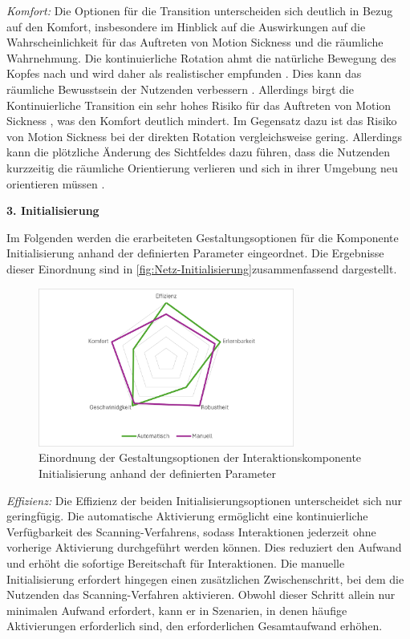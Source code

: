 \textit{Komfort:}
Die Optionen für die Transition unterscheiden sich deutlich in Bezug auf den Komfort, insbesondere im Hinblick auf die Auswirkungen auf die Wahrscheinlichkeit für das Auftreten von Motion Sickness und die räumliche Wahrnehmung.
Die kontinuierliche Rotation ahmt die natürliche Bewegung des Kopfes nach und wird daher als realistischer empfunden \citep{8797722}. Dies kann das räumliche Bewusstsein der Nutzenden verbessern \citep{10.1145/3441852.3471230}. Allerdings birgt die Kontinuierliche Transition ein sehr hohes Risiko für das Auftreten von Motion Sickness \citep{10.1007/s10055-020-00425-x, 8797722}, was den Komfort deutlich mindert.
Im Gegensatz dazu ist das Risiko von Motion Sickness bei der direkten Rotation vergleichsweise gering. Allerdings kann die plötzliche Änderung des Sichtfeldes dazu führen, dass die Nutzenden kurzzeitig die räumliche Orientierung verlieren und sich in ihrer Umgebung neu orientieren müssen \citep{10.1145/3441852.3471230}. 

\textbf{3. Initialisierung} 

Im Folgenden werden die erarbeiteten Gestaltungsoptionen für die Komponente Initialisierung anhand der definierten Parameter eingeordnet. Die Ergebnisse dieser Einordnung sind in \autoref{fig:Netz-Initialisierung}zusammenfassend dargestellt. 

\begin{figure}[tbh]
    \centering
    \includegraphics[width=0.75\textwidth]{images/Netzdiagramm-Initialisierung.png}
    \caption{Einordnung der Gestaltungsoptionen der Interaktionskomponente Initialisierung anhand der definierten Parameter}
    \label{fig:Netz-Initialisierung}
\end{figure}

\textit{Effizienz:}
Die Effizienz der beiden Initialisierungsoptionen unterscheidet sich nur geringfügig. Die automatische Aktivierung ermöglicht eine kontinuierliche Verfügbarkeit des Scanning-Verfahrens, sodass Interaktionen jederzeit ohne vorherige Aktivierung durchgeführt werden können. Dies reduziert den Aufwand und erhöht die sofortige Bereitschaft für Interaktionen. Die manuelle Initialisierung erfordert hingegen einen zusätzlichen Zwischenschritt, bei dem die Nutzenden das Scanning-Verfahren aktivieren. Obwohl dieser Schritt allein nur minimalen Aufwand erfordert, kann er in Szenarien, in denen häufige Aktivierungen erforderlich sind, den erforderlichen Gesamtaufwand erhöhen. 

